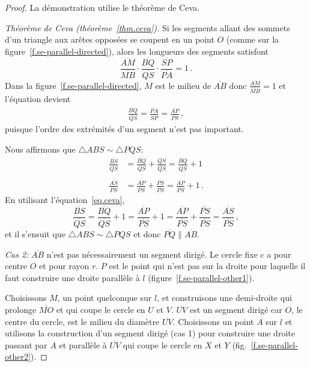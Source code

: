 \begin{proof}
La démonstration utilise le théorème de Ceva.

\textit{Théorème de Ceva   (théorème~\ref{thm.ceva}).} Si les segments  allant des sommets d'un triangle aux arêtes opposées se coupent en un point $O$ (comme sur la figure~\ref{f.se-parallel-directed}), alors les longueurs des segments satisfont 
\[
\frac{\overline{AM}}{\overline{MB}}\cdot\frac{\overline{BQ}}{\overline{QS}}\cdot\frac{\overline{SP}}{\overline{PA}} = 1\,.
\]
Dans la figure~\ref{f.se-parallel-directed}, $M$ est le milieu de $\overline{AB}$ donc 
 $\displaystyle\frac{\overline{AM}}{\overline{MB}}=1$ et l'équation devient 
\begin{align}
\frac{\overline{BQ}}{\overline{QS}}=\frac{\overline{PA}}{\overline{SP}}=\frac{\overline{AP}}{\overline{PS}}\,,\label{eq.ceva}
\end{align}
puisque l'ordre des extrémités d'un segment n'est pas important.

Nous affirmons que $\triangle ABS \sim \triangle PQS$:
\begin{align*}
\frac{\overline{BS}}{\overline{QS}}&=\frac{\overline{BQ}}{\overline{QS}}+\frac{\overline{QS}}{\overline{QS}} = \frac{\overline{BQ}}{\overline{QS}}+1\\
&\\
\frac{\overline{AS}}{\overline{PS}} &= \frac{\overline{AP}}{\overline{PS}} + \frac{\overline{PS}}{\overline{PS}} = \frac{\overline{AP}}{\overline{PS}} + 1\,.
\end{align*}
En utilisant l'équation~\ref{eq.ceva},
\[
\frac{\overline{BS}}{\overline{QS}}=\frac{\overline{BQ}}{\overline{QS}}+1=\frac{\overline{AP}}{\overline{PS}}+1=\frac{\overline{AP}}{\overline{PS}}+\frac{\overline{PS}}{\overline{PS}}=\frac{\overline{AS}}{\overline{PS}}\,,
\]
et il s'ensuit que $\triangle ABS \sim \triangle PQS$ et donc 
 $\overline{PQ}\parallel\overline{AB}$.

\textit{Cas 2:}
$\overline{AB}$ n'est pas nécessairement un segment  dirigé. Le cercle fixe $c$ a pour centre $O$ et pour rayon $r$. $P$ est le point qui n'est pas sur la droite pour laquelle il faut construire une droite parallèle à $l$ (figure~\ref{f.se-parallel-other1}).

Choisissons $M$, un point quelconque sur $l$, et construisons une demi-droite qui prolonge $\overline{MO}$ et qui coupe le cercle en $U$ et $V$.
$\overline{UV}$ est un segment  dirigé car $O$, le centre du cercle, est le milieu du diamètre $\overline{UV}$. Choisissons un point $A$ sur $l$ et utilisons la construction d'un segment  dirigé (cas 1) pour construire une droite passant par $A$ et parallèle à $\overline{UV}$ qui coupe le cercle en $X$ et $Y$  (fig.~\ref{f.se-parallel-other2}).


\end{proof}
